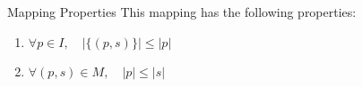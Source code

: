 \begin{frame}{Mapping Properties}
This mapping has the following properties:
\begin{enumerate}

\item
$\forall p \in I, \quad |\{(p,s)\}| \leq |p|$

\item
$\forall (p, s) \in M, \quad |p| \leq |s|$

\end{enumerate}
\end{frame}